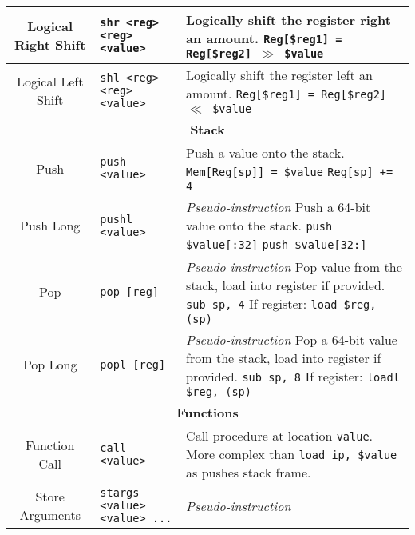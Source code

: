 \documentclass{article}
\begin{document}
\begin{longtable}{|c|l|l|}
    \hline
    Logical Right Shift & \texttt{shr <reg> <reg> <value>} & \makecell[l]{Logically shift the register right an amount.\\%
    \texttt{Reg[\$reg1] = Reg[\$reg2] \(\gg\) \$value}} \\
    \hline
    Logical Left Shift & \texttt{shl <reg> <reg> <value>} & \makecell[l]{Logically shift the register left an amount.\\%
    \texttt{Reg[\$reg1] = Reg[\$reg2] \(\ll\) \$value}} \\
    \hline \hline
    \multicolumn{3}{|c|}{\textbf{Stack}} \\
    \hline
    Push & \texttt{push <value>} & \makecell[l]{Push a value onto the stack.\\%
    \texttt{Mem[Reg[sp]] = \$value}\\%
    \texttt{Reg[sp] += 4}} \\
    \hline
    Push Long & \texttt{pushl <value>} & \makecell[l]{\textit{Pseudo-instruction}\\%
    Push a 64-bit value onto the stack.\\%
    \texttt{push \$value[:32]}\\%
    \texttt{push \$value[32:]}} \\
    \hline
    Pop & \texttt{pop [reg]} & \makecell[l]{\textit{Pseudo-instruction}\\%
    Pop value from the stack, load into register if provided.\\%
    \texttt{sub sp, 4}\\%
    If register: \texttt{load \$reg, (sp)}} \\
    \hline
    Pop Long & \texttt{popl [reg]} & \makecell[l]{\textit{Pseudo-instruction}\\%
    Pop a 64-bit value from the stack, load into register if provided.\\%
    \texttt{sub sp, 8}\\%
    If register: \texttt{loadl \$reg, (sp)}} \\
    \hline \hline
    \multicolumn{3}{|c|}{\textbf{Functions}} \\
    \hline
    Function Call & \texttt{call <value>} & \makecell[l]{Call procedure at location \texttt{value}.\\%
    More complex than \texttt{load ip, \$value} as pushes stack frame.} \\
    \hline
    Store Arguments & \texttt{stargs <value> <value> ...} & \makecell[l]{\textit{Pseudo-instruction}\\%
}
\end{longtable}
\end{document}
